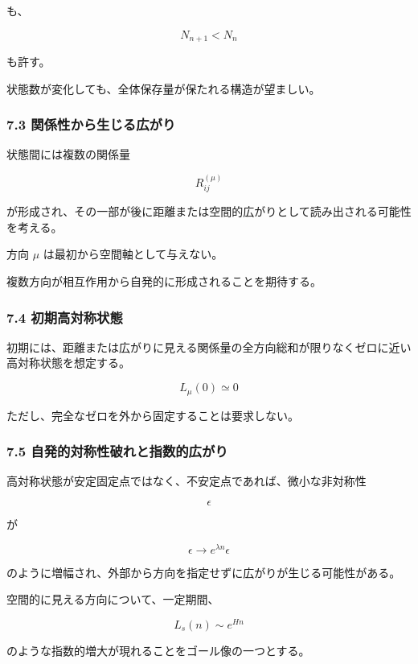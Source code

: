 \documentclass[
  a4paper,
]{ltjsarticle}
\begin{document}
も、

\[
N_{n+1}<N_n
\]

も許す。

状態数が変化しても、全体保存量が保たれる構造が望ましい。

\subsubsection{7.3
関係性から生じる広がり}\label{ux95a2ux4fc2ux6027ux304bux3089ux751fux3058ux308bux5e83ux304cux308a}

状態間には複数の関係量

\[
R_{ij}^{(\mu)}
\]

が形成され、その一部が後に距離または空間的広がりとして読み出される可能性を考える。

方向 \(\mu\) は最初から空間軸として与えない。

複数方向が相互作用から自発的に形成されることを期待する。

\subsubsection{7.4
初期高対称状態}\label{ux521dux671fux9ad8ux5bfeux79f0ux72b6ux614b}

初期には、距離または広がりに見える関係量の全方向総和が限りなくゼロに近い高対称状態を想定する。

\[
\boxed{
L_\mu(0)\simeq 0
}
\]

ただし、完全なゼロを外から固定することは要求しない。

\subsubsection{7.5
自発的対称性破れと指数的広がり}\label{ux81eaux767aux7684ux5bfeux79f0ux6027ux7834ux308cux3068ux6307ux6570ux7684ux5e83ux304cux308a}

高対称状態が安定固定点ではなく、不安定点であれば、微小な非対称性

\[
\epsilon
\]

が

\[
\epsilon\rightarrow e^{\lambda n}\epsilon
\]

のように増幅され、外部から方向を指定せずに広がりが生じる可能性がある。

空間的に見える方向について、一定期間、

\[
\boxed{
L_s(n)\sim e^{Hn}
}
\]

のような指数的増大が現れることをゴール像の一つとする。
\end{document}
